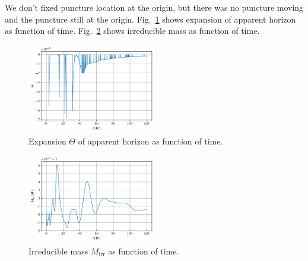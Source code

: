 \documentclass[%
 reprint,
 amsmath,amssymb,
 aps,
 prd,
]{revtex4-2}
\begin{document}
We don't fixed puncture location at the origin, but there was no puncture moving and the puncture still at the origin. Fig.~\ref{fig:expansion} shows expansion of apparent horizon as function of time. Fig.~\ref{fig:m_irr} shows irreducible mass as function of time. 

\begin{figure}[h]
	\includegraphics[width=0.5\textwidth]{data/expansion.png}%
	\caption{\label{fig:expansion} Expansion $\Theta$ of apparent horizon as function of time.}
\end{figure}

\begin{figure}[h]
	\includegraphics[width=0.5\textwidth]{data/m_irr.png}%
	\caption{\label{fig:m_irr} Irreducible mass $M_\mathrm{irr}$ as function of time.}
	\end{figure}


\end{document}
